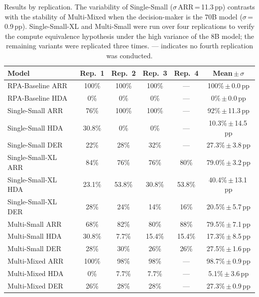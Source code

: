 \documentclass[preprint,12pt,numrefs]{elsarticle}
\begin{document}
\begin{table}[htbp]
\centering
\caption{Results by replication. The variability of Single-Small
         ($\sigma$\,ARR\,=\,11.3\,pp) contrasts with the stability of
         Multi-Mixed when the decision-maker is the 70B model
         ($\sigma$\,=\,0.9\,pp). Single-Small-XL and Multi-Small
         were run over four replications to verify the compute
         equivalence hypothesis under the high variance of the 8B
         model; the remaining variants were replicated three times.
         {---} indicates no fourth replication was conducted.}
\label{tab:replicas}
\begin{tabular}{lccccc}
\toprule
\textbf{Model} & \textbf{Rep.\ 1} & \textbf{Rep.\ 2} & \textbf{Rep.\ 3} &
  \textbf{Rep.\ 4} & \textbf{Mean\,$\pm$\,$\sigma$} \\
\midrule
RPA-Baseline ARR & 100\% & 100\% & 100\% & --- & 100\%\,$\pm$\,0.0\,pp \\
RPA-Baseline HDA & 0\%   & 0\%   & 0\%   & --- & 0\%\,$\pm$\,0.0\,pp   \\
\midrule
Single-Small ARR & 76\%   & 100\% & 100\% & --- & 92\%\,$\pm$\,11.3\,pp \\
Single-Small HDA & 30.8\% & 0\%   & 0\%   & --- & 10.3\%\,$\pm$\,14.5\,pp \\
Single-Small DER & 22\%   & 28\%  & 32\%  & --- & 27.3\%\,$\pm$\,3.8\,pp  \\
\midrule
Single-Small-XL ARR & 84\% & 76\% & 76\% & 80\% & 79.0\%\,$\pm$\,3.2\,pp \\
Single-Small-XL HDA & 23.1\% & 53.8\% & 30.8\% & 53.8\% & 40.4\%\,$\pm$\,13.1\,pp \\
Single-Small-XL DER & 28\% & 24\% & 14\% & 16\% & 20.5\%\,$\pm$\,5.7\,pp \\
\midrule
Multi-Small ARR & 68\% & 82\% & 80\% & 88\% & 79.5\%\,$\pm$\,7.1\,pp \\
Multi-Small HDA & 30.8\% & 7.7\% & 15.4\% & 15.4\% & 17.3\%\,$\pm$\,8.5\,pp \\
Multi-Small DER & 28\% & 30\% & 26\% & 26\% & 27.5\%\,$\pm$\,1.6\,pp \\
\midrule
Multi-Mixed ARR  & 100\%  & 98\%  & 98\%  & --- & 98.7\%\,$\pm$\,0.9\,pp \\
Multi-Mixed HDA  & 0\%    & 7.7\% & 7.7\% & --- & 5.1\%\,$\pm$\,3.6\,pp  \\
Multi-Mixed DER  & 26\%   & 28\%  & 28\%  & --- & 27.3\%\,$\pm$\,0.9\,pp \\
\bottomrule
\end{tabular}
\end{table}
\end{document}
